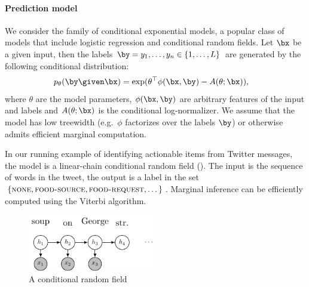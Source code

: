 
\paragraph{Prediction model}
We consider the family of conditional exponential models, a popular class of models that include logistic regression and conditional random fields.
Let $\bx$ be a given input, then the labels $\by = y_1, \ldots, y_n \in \{1, \dots, L\}$ are generated by the following conditional distribution:
\begin{align*}
  \p(\by \given \bx) 
  &= \exp( \theta^\top \phi(\bx, \by) - A(\theta; \bx)),
\end{align*}
where $\theta$ are the model parameters,
$\phi(\bx, \by)$ are arbitrary features of the input and labels and 
$A(\theta; \bx)$ is the conditional log-normalizer.
We assume that the model has low treewidth (e.g.\ $\phi$ factorizes over the labels $\by$) or otherwise admits efficient marginal computation.

In our running example of identifying actionable items from Twitter messages, the model is a linear-chain conditional random field (). The input is the sequence of words in the tweet, the output is a label in the set $\{\textsc{none}, \textsc{food-source},  \textsc{food-request}, \dots\}$. Marginal inference can be efficiently computed using the Viterbi algorithm.


\begin{figure}[t]
  \begin{centering}
  \includegraphics[width=0.5\textwidth]{figures/simple-crf.pdf}
  \end{centering}
  \caption{A conditional random field }
\label{fig:crf}
\end{figure}

